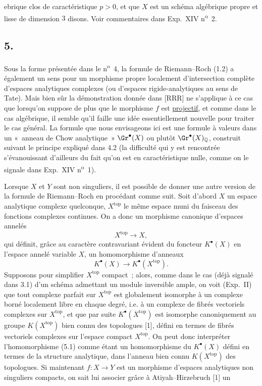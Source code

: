 ebrique clos de caract\'eristique $p>0$, et que $X$ est un sch\'ema alg\'ebrique propre et lisse de dimension $3$ disons. Voir commentaires dans Exp.\ XIV n\textsuperscript{o}~2.

\subsection*{5.}
Sous la forme pr\'esent\'ee dans le n\textsuperscript{o}~4, la formule de Riemann--Roch (1.2) a \'egalement un sens pour un morphisme propre localement d'intersection compl\`ete d'espaces analytiques complexes (ou d'espaces rigide-analytiques au sens de Tate). Mais bien s\^ur la d\'emonstration donn\'ee dans [RRR] ne s'applique \`a ce cas que lorsqu'on suppose de plus que le morphisme $f$ est \underline{projectif}, et comme dans le cas alg\'ebrique, il semble qu'il faille une id\'ee essentiellement nouvelle pour traiter le cas g\'en\'eral. La formule que nous envisageons ici est une formule \`a valeurs dans un «~anneau de Chow analytique~» $\Gr^\bullet(X)$ ou plut\^ot $\Gr^\bullet(X)_{\mathbb Q}$, construit suivant le principe expliqu\'e dans 4.2 (la difficult\'e qui y est rencontr\'ee s'\'evanouissant d'ailleurs du fait qu'on est en caract\'eristique nulle, comme on le signale dans Exp.\ XIV n\textsuperscript{o}~1).

Lorsque $X$ et $Y$ sont non singuliers, il est possible de donner une autre version de la formule de Riemann--Roch en proc\'edant comme suit. Soit d'abord $X$ un espace analytique complexe quelconque, $X^{\mathrm{top}}$ le m\^eme espace muni du faisceau des fonctions complexes continues. On a donc un morphisme canonique d'espaces annel\'es
\[
X^{\mathrm{top}}\longrightarrow X,
\]
qui d\'efinit, gr\^ace au caract\`ere contravariant \'evident du foncteur $K^\bullet(X)$ en l'espace annel\'e variable $X$, un homomorphisme d'anneaux
\begin{equation}\tag{5.1}
K^\bullet(X)\longrightarrow K^\bullet(X^{\mathrm{top}}).
\end{equation}
Supposons pour simplifier $X^{\mathrm{top}}$ compact~; alors, comme dans le cas (d\'ej\`a signal\'e dans 3.1) d'un sch\'ema admettant un module inversible ample, on voit (Exp.\ II) que tout complexe parfait sur $X^{\mathrm{top}}$ est globalement isomorphe \`a un complexe born\'e localement libre en chaque degr\'e, i.e. \`a un complexe de fibr\'es vectoriels complexes sur $X^{\mathrm{top}}$, et que par suite $K^\bullet(X^{\mathrm{top}})$ est isomorphe canoniquement au groupe $K(X^{\mathrm{top}})$ bien connu des topologues [1], d\'efini en termes de fibr\'es vectoriels complexes sur l'espace compact $X^{\mathrm{top}}$. On peut donc interpr\'eter l'homomorphisme (5.1) comme \'etant un homomorphisme du $K^\bullet(X)$ d\'efini en termes de la structure analytique, dans l'anneau bien connu $K(X^{\mathrm{top}})$ des topologues. Si maintenant $f:X\longrightarrow Y$ est un morphisme d'espaces analytiques non singuliers compacts, on sait lui associer gr\^ace \`a Atiyah--Hirzebruch [1] un
